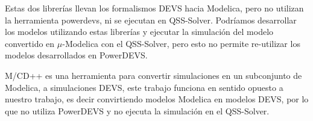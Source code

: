 Estas dos librerías llevan los formalismos DEVS hacia Modelica, pero no utilizan la herramienta powerdevs, ni se ejecutan en QSS-Solver.
Podríamos desarrollar los modelos utilizando estas librerías y ejecutar la simulación del modelo convertido en $\mu$-Modelica con el QSS-Solver, pero esto no permite re-utilizar los modelos desarrollados en PowerDEVS.


M/CD++ \cite{conf/mascots/DAbreuW05} es una herramienta para convertir simulaciones en un subconjunto de Modelica, a simulaciones DEVS, este trabajo funciona en sentido opuesto a nuestro trabajo, es decir convirtiendo modelos Modelica en modelos DEVS, por lo que no utiliza PowerDEVS y no ejecuta la simulación en el QSS-Solver.

